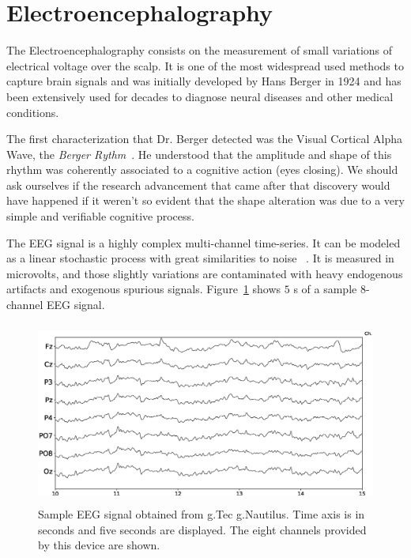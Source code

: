 \documentclass[brainsci,article,accept,moreauthors,pdftex,10pt,a4paper]{mdpi}
\begin{document}
\section{Electroencephalography}
\label{EEG}

The Electroencephalography consists on the measurement of small variations of electrical voltage over the scalp.  It is one of the most widespread used methods to capture brain signals and was initially developed by Hans Berger in 1924 and has been extensively used for decades to diagnose neural diseases and other medical conditions.

The first characterization that Dr. Berger detected was the Visual Cortical Alpha Wave, the \textit{Berger Rythm}~\citep{Jansen1991}.  He understood that the amplitude and shape of this rhythm was coherently associated to a cognitive action (eyes closing).  
We should ask ourselves if the research advancement that came after that discovery would have happened if it weren't so evident that the shape alteration was due to a very simple and verifiable cognitive process.

The EEG signal is a highly complex multi-channel time-series.  It can be modeled as a linear stochastic process with great similarities to noise ~\citep{Thakor2004}.  It is measured in microvolts, and those slightly variations are contaminated with heavy endogenous artifacts and exogenous spurious signals.  Figure~\ref{fig:sampleeeg} shows $5$ s of a sample 8-channel EEG signal.
 
\begin{figure}[H]
\centering
\includegraphics[height=6cm,width=12cm]{images/sampleeeg.eps}
\caption{Sample EEG signal obtained from g.Tec g.Nautilus.  Time axis is in seconds and five seconds are displayed.  The eight channels provided by this device are shown.}
\label{fig:sampleeeg}
\end{figure}

\end{document}
